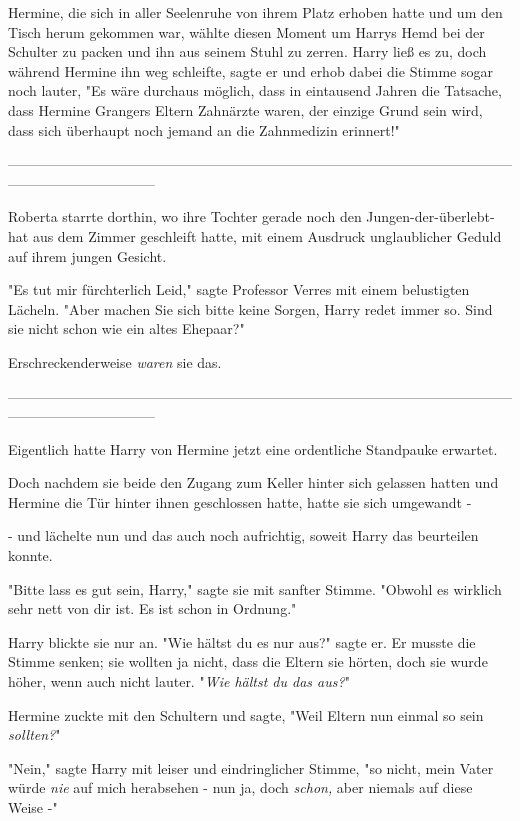 {Hermine, die sich in aller Seelenruhe von ihrem Platz erhoben hatte und um den Tisch herum gekommen war, wählte diesen Moment um Harrys Hemd bei der Schulter zu packen und ihn aus seinem Stuhl zu zerren. Harry ließ es zu, doch während Hermine ihn weg schleifte, sagte er und erhob dabei die Stimme sogar noch lauter, "Es wäre durchaus möglich, dass in eintausend Jahren die Tatsache, dass Hermine Grangers Eltern Zahnärzte waren, der einzige Grund sein wird, dass sich überhaupt noch jemand an die Zahnmedizin erinnert!"

--------------------------------------------------------------------------------------------------------------------------------------------

Roberta starrte dorthin, wo ihre Tochter gerade noch den Jungen-der-überlebt-hat aus dem Zimmer geschleift hatte, mit einem Ausdruck unglaublicher Geduld auf ihrem jungen Gesicht.

"Es tut mir fürchterlich Leid," sagte Professor Verres mit einem belustigten Lächeln. "Aber machen Sie sich bitte keine Sorgen, Harry redet immer so. Sind sie nicht schon wie ein altes Ehepaar?"

Erschreckenderweise \emph{waren} sie das.

--------------------------------------------------------------------------------------------------------------------------------------------

Eigentlich hatte Harry von Hermine jetzt eine ordentliche Standpauke erwartet.

Doch nachdem sie beide den Zugang zum Keller hinter sich gelassen hatten und Hermine die Tür hinter ihnen geschlossen hatte, hatte sie sich umgewandt -

- und lächelte nun und das auch noch aufrichtig, soweit Harry das beurteilen konnte.

"Bitte lass es gut sein, Harry," sagte sie mit sanfter Stimme. "Obwohl es wirklich sehr nett von dir ist. Es ist schon in Ordnung."

Harry blickte sie nur an. "Wie hältst du es nur aus?" sagte er. Er musste die Stimme senken; sie wollten ja nicht, dass die Eltern sie hörten, doch sie wurde höher, wenn auch nicht lauter. "\emph{Wie hältst du das aus?}"

Hermine zuckte mit den Schultern und sagte, "Weil Eltern nun einmal so sein \emph{sollten?}"

"Nein," sagte Harry mit leiser und eindringlicher Stimme, "so nicht, mein Vater würde \emph{nie} auf mich herabsehen - nun ja, doch \emph{schon,} aber niemals auf diese Weise -"

}
